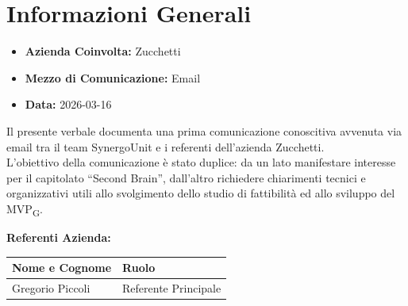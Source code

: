 \section{Informazioni Generali}
\begin{itemize}
	\item \textbf{Azienda Coinvolta:} {Zucchetti}
	\item \textbf{Mezzo di Comunicazione:} {Email}
	\item \textbf{Data:} 2026-03-16
\end{itemize}

Il presente verbale documenta una prima comunicazione conoscitiva avvenuta via email tra il team SynergoUnit e i referenti dell’azienda Zucchetti. \\
L’obiettivo della comunicazione è stato duplice: da un lato manifestare interesse per il capitolato “Second Brain”, dall’altro richiedere chiarimenti tecnici e organizzativi utili allo svolgimento dello studio di fattibilità ed allo sviluppo del MVP\textsubscript{G}.

\vspace{0.5cm}
\textbf{Referenti Azienda:}
\begin{table}[ht]
	\centering
	\renewcommand{\arraystretch}{1.2}
	\begin{tabularx}{\textwidth}{X l}
		\toprule
		\textbf{Nome e Cognome} & \textbf{Ruolo} \\
		\midrule
		{Gregorio Piccoli} & {Referente Principale} \\
		\bottomrule
	\end{tabularx}
\end{table}

